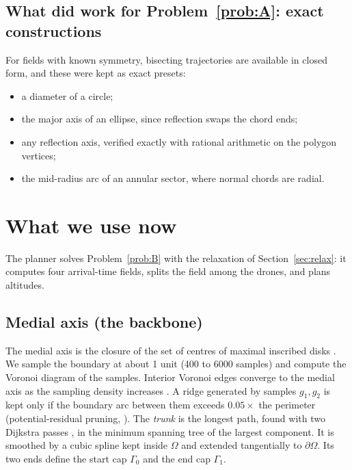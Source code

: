 \documentclass[11pt,a4paper]{article}
\numberwithin{equation}{section}
\theoremstyle{plain}
\theoremstyle{definition}
\theoremstyle{remark}
\newcommand{\pO}{\partial\Omega}
\begin{document}
\subsection{What did work for Problem~\ref{prob:A}: exact constructions}
For fields with known symmetry, bisecting trajectories are available in closed form, and these were kept as exact presets:
\begin{itemize}
  \item a diameter of a circle;
  \item the major axis of an ellipse, since reflection swaps the chord ends;
  \item any reflection axis, verified exactly with rational arithmetic on the polygon vertices;
  \item the mid-radius arc of an annular sector, where normal chords are radial.
\end{itemize}

\section{What we use now}
\label{sec:method}

The planner solves Problem~\ref{prob:B} with the relaxation of Section~\ref{sec:relax}: it computes four arrival-time fields, splits the field among the drones, and plans altitudes.

\subsection{Medial axis (the backbone)}
The medial axis is the closure of the set of centres of maximal inscribed disks \citep{blum1967,choi1997}. We sample the boundary at about 1 unit (400 to 6000 samples) and compute the Voronoi diagram of the samples. Interior Voronoi edges converge to the medial axis as the sampling density increases \citep{brandt1992}. A ridge generated by samples $g_1,g_2$ is kept only if the boundary arc between them exceeds $0.05\times$ the perimeter (potential-residual pruning, \citealp{ogniewicz1995}). The \emph{trunk} is the longest path, found with two Dijkstra passes \citep{dijkstra1959}, in the minimum spanning tree of the largest component. It is smoothed by a cubic spline kept inside $\Omega$ and extended tangentially to $\pO$. Its two ends define the start cap $\Gamma_0$ and the end cap $\Gamma_1$.
\end{document}
